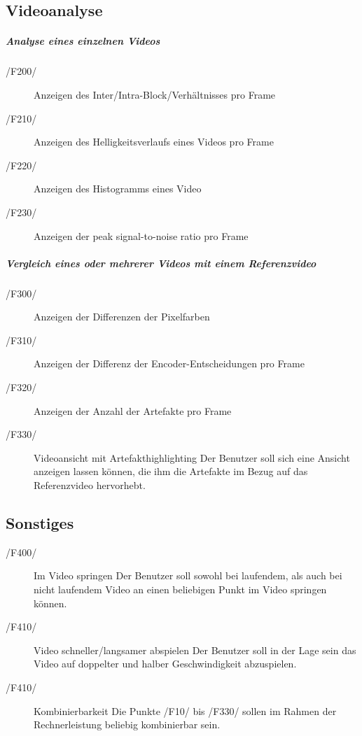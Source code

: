 \subsection{Videoanalyse}
\subparagraph{Analyse eines einzelnen Videos} 
	\begin{description}
	        \item[/F200/]Anzeigen des Inter/Intra-Block/Verhältnisses pro Frame
                \item[/F210/]Anzeigen des Helligkeitsverlaufs eines Videos pro Frame
                \item[/F220/]Anzeigen des Histogramms eines Video
                \item[/F230/]Anzeigen der peak signal-to-noise ratio pro Frame
        \end{description}
\subparagraph{Vergleich eines oder mehrerer Videos mit einem Referenzvideo}
        \begin{description}
   	        \item[/F300/]Anzeigen der Differenzen der Pixelfarben
                \item[/F310/]Anzeigen der Differenz der Encoder-Entscheidungen pro Frame
                \item[/F320/]Anzeigen der Anzahl der Artefakte pro Frame
                \item[/F330/]Videoansicht mit Artefakthighlighting \newline
			Der Benutzer soll sich eine Ansicht anzeigen lassen können, die ihm die Artefakte im Bezug auf das Referenzvideo hervorhebt.
        \end{description}  
\subsection{Sonstiges}
	\begin{description}
		\item[/F400/]Im Video springen \newline
			Der Benutzer soll sowohl bei laufendem, als auch bei nicht laufendem Video an einen beliebigen Punkt im Video springen können.
		\item[/F410/]Video schneller/langsamer abspielen \newline
			Der Benutzer soll in der Lage sein das Video auf doppelter und halber Geschwindigkeit abzuspielen.	
  		\item[/F410/]Kombinierbarkeit \newline
			Die Punkte /F10/ bis /F330/ sollen im Rahmen der Rechnerleistung beliebig kombinierbar sein.
        \end{description}

